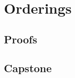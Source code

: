 \chapter{Orderings}
\label{ch:orderings}

\LRAExcludeFromPrintEditionBegin
\section*{Proofs}

\section*{Capstone}

\LRAExcludeFromPrintEditionEnd
